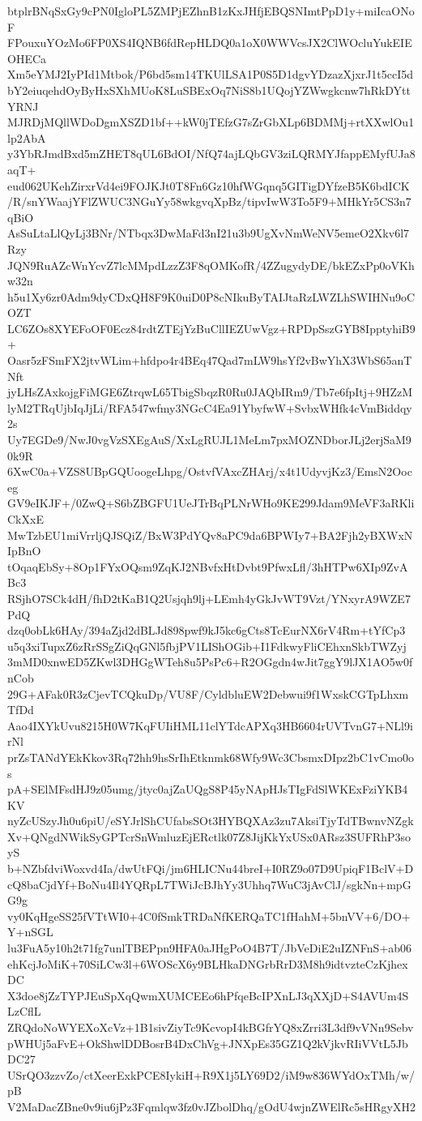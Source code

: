 btplrBNqSxGy9cPN0IgloPL5ZMPjEZhnB1zKxJHfjEBQSNImtPpD1y+miIcaONoF
FPouxuYOzMo6FP0XS4IQNB6fdRepHLDQ0a1oX0WWVcsJX2ClWOcluYukEIEOHECa
Xm5eYMJ2IyPId1Mtbok/P6bd5sm14TKUlLSA1P0S5D1dgvYDzazXjxrJ1t5ccI5d
bY2eiuqehdOyByHxSXhMUoK8LuSBExOq7NiS8b1UQojYZWwgkcnw7hRkDYttYRNJ
MJRDjMQllWDoDgmXSZD1bf++kW0jTEfzG7sZrGbXLp6BDMMj+rtXXwlOu1lp2AbA
y3YbRJmdBxd5mZHET8qUL6BdOI/NfQ74ajLQbGV3ziLQRMYJfappEMyfUJa8aqT+
eud062UKehZirxrVd4ei9FOJKJt0T8Fn6Gz10hfWGqnq5GITigDYfzeB5K6bdICK
/R/snYWaajYFlZWUC3NGuYy58wkgvqXpBz/tipvIwW3To5F9+MHkYr5CS3n7qBiO
AsSuLtaLlQyLj3BNr/NTbqx3DwMaFd3nI21u3b9UgXvNmWeNV5emeO2Xkv6l7Rzy
JQN9RuAZcWnYcvZ7lcMMpdLzzZ3F8qOMKofR/4ZZugydyDE/bkEZxPp0oVKhw32n
h5u1Xy6zr0Adm9dyCDxQH8F9K0uiD0P8cNIkuByTAIJtaRzLWZLhSWIHNu9oCOZT
LC6ZOs8XYEFoOF0Ecz84rdtZTEjYzBuCllIEZUwVgz+RPDpSszGYB8IpptyhiB9+
Oasr5zFSmFX2jtvWLim+hfdpo4r4BEq47Qad7mLW9hsYf2vBwYhX3WbS65anTNft
jyLHsZAxkojgFiMGE6ZtrqwL65TbigSbqzR0Ru0JAQbIRm9/Tb7e6fpItj+9HZzM
lyM2TRqUjbIqJjLi/RFA547wfmy3NGcC4Ea91YbyfwW+SvbxWHfk4cVmBiddqy2s
Uy7EGDe9/NwJ0vgVzSXEgAuS/XxLgRUJL1MeLm7pxMOZNDborJLj2erjSaM90k9R
6XwC0a+VZS8UBpGQUoogeLhpg/OstvfVAxcZHArj/x4t1UdyvjKz3/EmsN2Ooceg
GV9eIKJF+/0ZwQ+S6bZBGFU1UeJTrBqPLNrWHo9KE299Jdam9MeVF3aRKliCkXxE
MwTzbEU1miVrrljQJSQiZ/BxW3PdYQv8aPC9da6BPWIy7+BA2Fjh2yBXWxNIpBnO
tOqaqEbSy+8Op1FYxOQsm9ZqKJ2NBvfxHtDvbt9PfwxLfl/3hHTPw6XIp9ZvABc3
RSjhO7SCk4dH/fhD2tKaB1Q2Usjqh9lj+LEmh4yGkJvWT9Vzt/YNxyrA9WZE7PdQ
dzq0obLk6HAy/394aZjd2dBLJd898pwf9kJ5kc6gCts8TcEurNX6rV4Rm+tYfCp3
u5q3xiTupxZ6zRrSSgZiQqGNl5fbjPV1LIShOGib+I1FdkwyFliCEhxnSkbTWZyj
3mMD0xnwED5ZKwl3DHGgWTeh8u5PsPc6+R2OGgdn4wJit7ggY9lJX1AO5w0fnCob
29G+AFak0R3zCjevTCQkuDp/VU8F/CyldbluEW2Debwui9f1WxskCGTpLhxmTfDd
Aao4IXYkUvu8215H0W7KqFUIiHML11clYTdcAPXq3HB6604rUVTvnG7+NLl9irNl
prZsTANdYEkKkov3Rq72hh9hsSrIhEtknmk68Wfy9Wc3CbsmxDIpz2bC1vCmo0os
pA+SElMFsdHJ9z05umg/jtyc0ajZaUQgS8P45yNApHJsTIgFdSlWKExFziYKB4KV
nyZcUSzyJh0u6piU/eSYJrlShCUfabsSOt3HYBQXAz3zu7AksiTjyTdTBwnvNZgk
Xv+QNgdNWikSyGPTcrSnWmluzEjERctlk07Z8JijKkYxUSx0ARsz3SUFRhP3soyS
b+NZbfdviWoxvd4Ia/dwUtFQi/jm6HLICNu44breI+I0RZ9o07D9UpiqF1BclV+D
cQ8baCjdYf+BoNu4Il4YQRpL7TWiJcBJhYy3Uhhq7WuC3jAvClJ/sgkNn+mpGG9g
vy0KqHgeSS25fVTtWI0+4C0fSmkTRDaNfKERQaTC1fHahM+5bnVV+6/DO+Y+nSGL
lu3FuA5y10h2t71fg7unlTBEPpn9HFA0aJHgPoO4B7T/JbVeDiE2uIZNFnS+ab06
ehKcjJoMiK+70SiLCw3l+6WOScX6y9BLHkaDNGrbRrD3M8h9idtvzteCzKjhexDC
X3doe8jZzTYPJEuSpXqQwmXUMCEEo6hPfqeBcIPXnLJ3qXXjD+S4AVUm4SLzCflL
ZRQdoNoWYEXoXcVz+1B1sivZiyTc9KcvopI4kBGfrYQ8xZrri3L3df9vVNn9Sebv
pWHUj5aFvE+OkShwlDDBosrB4DxChVg+JNXpEs35GZ1Q2kVjkvRIiVVtL5JbDC27
USrQO3zzvZo/ctXeerExkPCE8IykiH+R9X1j5LY69D2/iM9w836WYdOxTMh/w/pB
V2MaDacZBne0v9iu6jPz3Fqmlqw3fz0vJZbolDhq/gOdU4wjnZWElRc5sHRgyXH2
